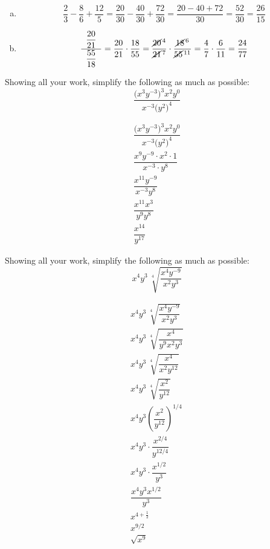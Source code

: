 \documentclass[12pt,letterpaper]{exam}
\begin{document}
\begin{questions}
\sol 
\begin{enumerate}[(a)]
\item 
	\[
	\dfrac{2}{3} - \dfrac{8}{6} + \dfrac{12}{5}= \dfrac{20}{30} - \dfrac{40}{30} + \dfrac{72}{30}= \dfrac{20 - 40 + 72}{30}= \dfrac{52}{30}= \dfrac{26}{15}
	\] \pspace

\item 
	\[
	\dfrac{\;\;\dfrac{20}{21}\;\;}{\;\;\dfrac{55}{18}\;\;}= \dfrac{20}{21} \cdot \dfrac{18}{55}= \dfrac{\cancel{20}^{\,4}}{\cancel{21}^{\,7}} \cdot \dfrac{\cancel{18}^{\,6}}{\cancel{55}^{\,11}}= \dfrac{4}{7} \cdot \dfrac{6}{11}= \dfrac{24}{77}
	\]
\end{enumerate}



\newpage
\question[10] Showing all your work, simplify the following as much as possible: 
	\[
	\dfrac{\big( x^3 y^{-3} \big)^3 x^2 y^0}{x^{-3} \big( y^2 \big)^4}
	\] \pspace

\sol 
	\[
	\begin{gathered}
	\dfrac{\big( x^3 y^{-3} \big)^3 x^2 y^0}{x^{-3} \big( y^2 \big)^4} \\[0.3cm]
	\dfrac{x^9 y^{-9} \cdot x^2 \cdot 1}{x^{-3} \cdot y^8} \\[0.3cm]
	\dfrac{x^{11} y^{-9}}{x^{-3} y^8} \\[0.3cm]
	\dfrac{x^{11} x^3}{y^9 y^8} \\[0.3cm]
	\dfrac{x^{14}}{y^{17}}
	\end{gathered}
	\]



\newpage
\question[10] Showing all your work, simplify the following as much as possible: 
	\[
	x^4 y^3 \, \sqrt[4]{\dfrac{x^4 y^{-9}}{x^2 y^3}}
	\] \pspace

\sol 
	\[
	\begin{gathered}
	x^4 y^3 \, \sqrt[4]{\dfrac{x^4 y^{-9}}{x^2 y^3}} \\[0.3cm]
	x^4 y^3 \, \sqrt[4]{\dfrac{x^4}{y^9 x^2 y^3}} \\[0.3cm]
	x^4 y^3 \, \sqrt[4]{\dfrac{x^4}{x^2 y^{12}}} \\[0.3cm]
	x^4 y^3 \, \sqrt[4]{\dfrac{x^2}{y^{12}}} \\[0.3cm]
	x^4 y^3 \left( \dfrac{x^2}{y^{12}} \right)^{1/4} \\[0.3cm]
	x^4 y^3 \cdot \dfrac{x^{2/4}}{y^{12/4}} \\[0.3cm]
	x^4 y^3 \cdot \dfrac{x^{1/2}}{y^3} \\[0.3cm]
	\dfrac{x^4 y^3 x^{1/2}}{y^3} \\[0.3cm]
	x^{4 + \frac{1}{2}} \\[0.3cm]
	x^{9/2} \\[0.3cm]
	\sqrt{x^9}
	\end{gathered}
	\]




\end{questions}
\end{document}
